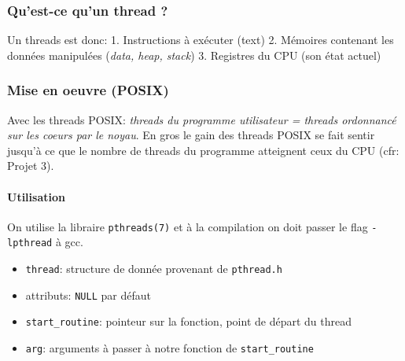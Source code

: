 \subsubsection{Qu'est-ce qu'un thread ?}\label{quest-ce-quun-thread}

Un threads est donc: 1. Instructions à exécuter (text) 2. Mémoires
contenant les données manipulées (\emph{data, heap, stack}) 3. Registres
du CPU (son état actuel)

\subsubsection{Mise en oeuvre (POSIX)}\label{mise-en-oeuvre-posix}

Avec les threads POSIX: \emph{threads du programme utilisateur = threads
ordonnancé sur les coeurs par le noyau}. En gros le gain des threads
POSIX se fait sentir jusqu'à ce que le nombre de threads du programme
atteignent ceux du CPU (cfr: Projet 3).

\paragraph{Utilisation}\label{utilisation}

On utilise la libraire \texttt{pthreads(7)} et à la compilation on doit
passer le flag \texttt{-lpthread} à gcc.

\begin{Shaded}
\begin{Highlighting}[]

\OperatorTok{(}\OperatorTok{*}\OperatorTok{,}
                   \OperatorTok{*}\OperatorTok{,}
                    \OperatorTok{*(*}\OperatorTok{)(} \OperatorTok{*),}
                    \OperatorTok{*}\OperatorTok{);}
\end{Highlighting}
\end{Shaded}

\begin{itemize}
\tightlist
\item
  \texttt{thread}: structure de donnée provenant de \texttt{pthread.h}
\item
  attributs: \texttt{NULL} par défaut
\item
  \texttt{start\_routine}: pointeur sur la fonction, point de départ du
  thread
\item
  \texttt{arg}: arguments à passer à notre fonction de
  \texttt{start\_routine}
\end{itemize}

